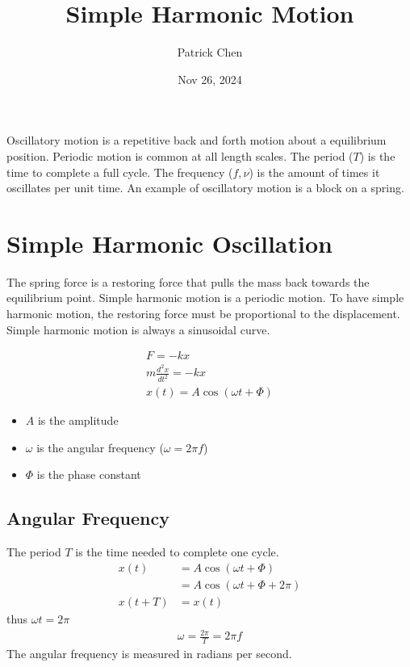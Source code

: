 \documentclass{article}
\title{Simple Harmonic Motion}
\author{Patrick Chen}
\date{Nov 26, 2024}
\theoremstyle{mytheoremstyle}
\theoremstyle{mytheoremstyle}
\theoremstyle{myproblemstyle}
\begin{document}
    \maketitle
    Oscillatory motion is a repetitive back and forth motion about a equilibrium
    position. Periodic motion is common at all length scales. The period ($T$)
    is the time to complete a full cycle. The frequency ($f,\nu$) is the amount
    of times it oscillates per unit time. An example of oscillatory motion is a
    block on a spring.

    \section*{Simple Harmonic Oscillation}
    The spring force is a restoring force that pulls the mass back towards the
    equilibrium point. Simple harmonic motion is a periodic motion. To have
    simple harmonic motion, the restoring force must be proportional to the
    displacement. Simple harmonic motion is always a sinusoidal curve.

    \begin{align*}
        F = -kx \\
        m \frac{d^2 x}{dt^2} = -k x \\
        x(t) = A\cos(\omega t + \Phi)
    \end{align*}
    \begin{itemize}
        \item $A$ is the amplitude
        \item $\omega$ is the angular frequency ($\omega = 2\pi f$)
        \item $\Phi$ is the phase constant
    \end{itemize}

    \subsection*{Angular Frequency}
    The period $T$ is the time needed to complete one cycle.
    \begin{align*}
        x(t) &= A\cos(\omega t+\Phi) \\
        &= A\cos(\omega t+\Phi + 2\pi) \\
        x(t+T) &= x(t)
    \end{align*}
    thus $\omega t = 2\pi$
    \begin{align*}
        \omega = \frac{2\pi}{T} = 2\pi f
    \end{align*}
    The angular frequency is measured in radians per second.
\end{document}
